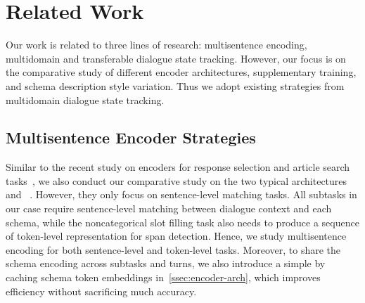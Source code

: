 \section{Related Work}
\label{sec:sgd:related-work}
Our work is related to three lines of research: multisentence
encoding, multidomain and transferable dialogue state
tracking. However, our focus is on the comparative study of different
encoder architectures, supplementary training, and schema
description style variation. Thus we adopt existing strategies from
multidomain dialogue state tracking.

\subsection{Multisentence Encoder Strategies}
\label{ssec:sgd:multi-encoder}
Similar to the recent study on encoders for response selection and
article search tasks~\citet{humeau2019poly}, we also conduct our
comparative study on the two typical architectures
\CE~\citep{bordes2014open, lowe2015ubuntu} and
\DE~\citep{wu2017sequential,yang2018response}. However, they only focus
on sentence-level matching tasks. All subtasks in our case require
sentence-level matching between dialogue context and each schema, while
the noncategorical slot filling task also needs to produce a sequence
of token-level representation for span detection. Hence, we study
multisentence encoding for both sentence-level and token-level
tasks. Moreover, to share the schema encoding across subtasks and
turns, we also introduce a simple \FE by caching schema token
embeddings in~\autoref{ssec:encoder-arch}, which improves efficiency
without sacrificing much accuracy.

